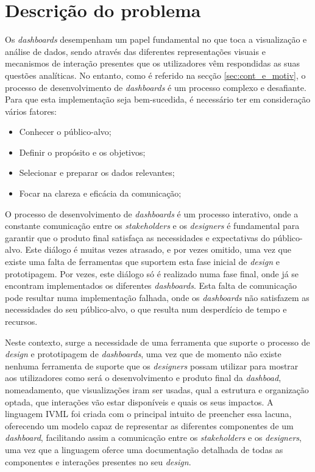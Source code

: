 \section{Descrição do problema}
\label{sec:des_problema}

Os \textit{dashboards} desempenham um papel fundamental no que toca a visualização e análise de dados, sendo através das diferentes representações visuais e mecanismos de interação presentes que os utilizadores vêm respondidas as suas questões analíticas. No entanto, como é referido na secção \ref{sec:cont_e_motiv}, o processo de desenvolvimento de \textit{dashboards} é um processo complexo e desafiante. Para que esta implementação seja bem-sucedida, é necessário ter em consideração vários fatores:

\begin{itemize}
    \item Conhecer o público-alvo;
    \item Definir o propósito e os objetivos;
    \item Selecionar e preparar os dados relevantes;
    \item Focar na clareza e eficácia da comunicação;
\end{itemize}

O processo de desenvolvimento de \textit{dashboards} é um processo interativo, onde a constante comunicação entre os \textit{stakeholders} e os \textit{designers} é fundamental para garantir que o produto final satisfaça as necessidades e expectativas do público-alvo. Este diálogo é muitas vezes atrasado, e por vezes omitido, uma vez que existe uma falta de ferramentas que suportem esta fase inicial de \textit{design} e prototipagem. Por vezes, este diálogo só é realizado numa fase final, onde já se encontram implementados os diferentes \textit{dashboards}. Esta falta de comunicação pode resultar numa implementação falhada, onde os \textit{dashboards} não satisfazem as necessidades do seu público-alvo, o que resulta num desperdício de tempo e recursos.

Neste contexto, surge a necessidade de uma ferramenta que suporte o processo de \textit{design} e prototipagem de \textit{dashboards}, uma vez que de momento não existe nenhuma ferramenta de suporte que os \textit{designers} possam utilizar para mostrar aos utilizadores como será o desenvolvimento e produto final da \textit{dashboad}, nomeadamento, que visualizações iram ser usadas, qual a estrutura e organização optada, que interações vão estar disponíveis e quais os seus impactos. A linguagem \gls{IVML} foi criada com o principal intuito de preencher essa lacuna, oferecendo um modelo capaz de representar as diferentes componentes de um \textit{dashboard}, facilitando assim a comunicação entre os \textit{stakeholders} e os \textit{designers}, uma vez que a linguagem oferce uma documentação detalhada de todas as componentes e interações presentes no seu \textit{design}.

